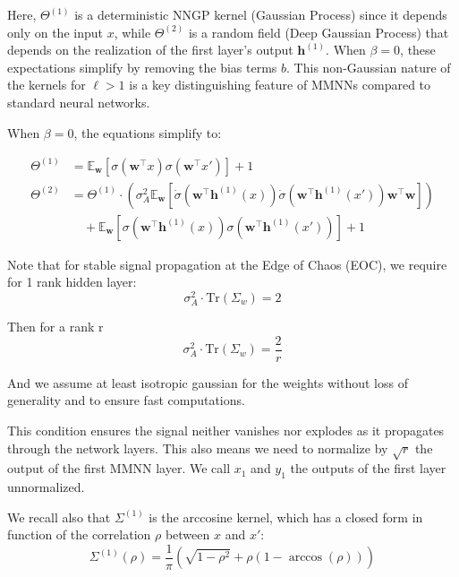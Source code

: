 \documentclass[a4paper]{article}
\begin{document}
Here, $\Theta^{(1)}$ is a deterministic NNGP kernel (Gaussian Process) since it depends only on the input $x$, while $\Theta^{(2)}$ is a random field (Deep Gaussian Process) that depends on the realization of the first layer's output $\bm{h}^{(1)}$. When $\beta = 0$, these expectations simplify by removing the bias terms $b$. This non-Gaussian nature of the kernels for $\ell > 1$ is a key distinguishing feature of MMNNs compared to standard neural networks.

\newline
When $\beta = 0$, the equations simplify to:
\begin{tcolorbox}[title=Main focus: NTK kernels with $\beta=0$]
\begin{align*}
    \Theta^{(1)} &= \mathbb{E}_{\bm{w}} \left[ \sigma(\bm{w}^\top x) \sigma(\bm{w}^\top x') \right] + 1 \\
    \Theta^{(2)} &= \Theta^{(1)} \cdot \left(\sigma_A^2 \mathbb{E}_{\bm{w}} \left[ \dot{\sigma}(\bm{w}^\top \bm{h}^{(1)}(x)) \dot{\sigma}(\bm{w}^\top \bm{h}^{(1)}(x')) \bm{w}^\top\bm{w} \right]\right) \\
    &\quad + \mathbb{E}_{\bm{w}} \left[ \sigma(\bm{w}^\top \bm{h}^{(1)}(x)) \sigma(\bm{w}^\top \bm{h}^{(1)}(x')) \right] + 1
\end{align*}
\end{tcolorbox}

Note that for stable signal propagation at the Edge of Chaos (EOC), we require for 1 rank hidden layer:
\begin{equation*}
    \sigma_A^2 \cdot \text{Tr}(\Sigma_w) = 2
\end{equation*}

Then for a rank r
\begin{equation*}
    \sigma_A^2 \cdot \text{Tr}(\Sigma_w) = \frac{2}{r}
\end{equation*}

And we assume at least isotropic gaussian for the weights without loss of generality and to ensure fast computations.

This condition ensures the signal neither vanishes nor explodes as it propagates through the network layers.
This also means we need to normalize by $\sqrt{r}$ the output of the first MMNN layer.
We call $x_1$ and $y_1$ the outputs of the first layer unnormalized.

We recall also that $\Sigma^{(1)}$ is the arccosine kernel, which has a closed form in function of the correlation $\rho$ between $x$ and $x'$:
\[
\Sigma^{(1)}(\rho) =  \frac{1}{\pi}\left(\sqrt{1-\rho^2} + \rho(1-\arccos(\rho))\right)
\]
\end{document}

